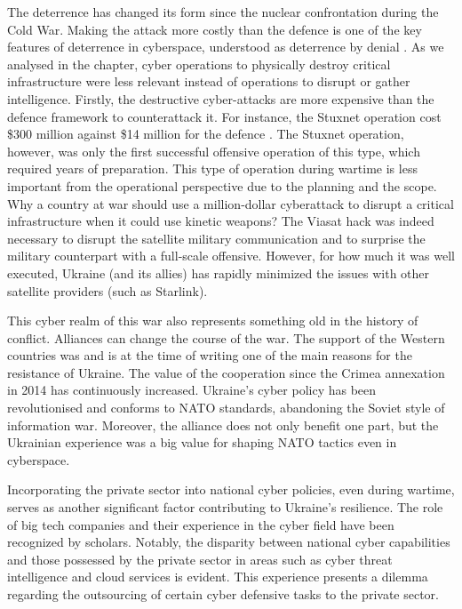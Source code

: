 The deterrence has changed its form since the nuclear confrontation during the Cold War. Making the attack more costly than the defence is one of the key features of deterrence in cyberspace, understood as deterrence by denial \autocite{nye_2017_deterrence}. As we analysed in the chapter, cyber operations to physically destroy critical infrastructure were less relevant instead of operations to disrupt or gather intelligence. Firstly, the destructive cyber-attacks are more expensive than the defence framework to counterattack it. For instance, the Stuxnet operation cost \$300 million against \$14 million for the defence \autocite{slayton_2017_what}. The Stuxnet operation, however, was only the first successful offensive operation of this type, which required years of preparation. This type of operation during wartime is less important from the operational perspective due to the planning and the scope. Why a country at war should use a million-dollar cyberattack to disrupt a critical infrastructure when it could use kinetic weapons? The Viasat hack was indeed necessary to disrupt the satellite military communication and to surprise the military counterpart with a full-scale offensive. However, for how much it was well executed, Ukraine (and its allies) has rapidly minimized the issues with other satellite providers (such as Starlink). 

This cyber realm of this war also represents something old in the history of conflict. Alliances can change the course of the war. The support of the Western countries was and is at the time of writing one of the main reasons for the resistance of Ukraine. The value of the cooperation since the Crimea annexation in 2014 has continuously increased. Ukraine's cyber policy has been revolutionised and conforms to NATO standards, abandoning the Soviet style of information war. Moreover, the alliance does not only benefit one part, but the Ukrainian experience was a big value for shaping NATO tactics even in cyberspace. 

Incorporating the private sector into national cyber policies, even during wartime, serves as another significant factor contributing to Ukraine's resilience. The role of big tech companies and their experience in the cyber field have been recognized by scholars. Notably, the disparity between national cyber capabilities and those possessed by the private sector in areas such as cyber threat intelligence and cloud services is evident. This experience presents a dilemma regarding the outsourcing of certain cyber defensive tasks to the private sector.

